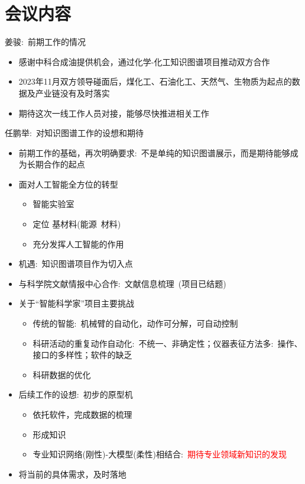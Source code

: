 
%
%
%

\section*{会议内容}
{姜骏}:~前期工作的情况
\begin{itemize}
	\item 感谢中科合成油提供机会，通过化学-化工知识图谱项目推动双方合作
	\item 2023年11月双方领导碰面后，煤化工、石油化工、天然气、生物质为起点的数据及产业链没有及时落实
	\item 期待这次一线工作人员对接，能够尽快推进相关工作
\end{itemize}

{任鹏举}:~对知识图谱工作的设想和期待
\begin{itemize}
	\item 前期工作的基础，再次明确要求:~不是单纯的知识图谱展示，而是期待能够成为长期合作的起点
	\item 面对人工智能全方位的转型
		\begin{itemize}
			\item 智能实验室
			\item 定位 基材料(能源~材料)
			\item 充分发挥人工智能的作用
		\end{itemize}
	\item 机遇:~知识图谱项目作为切入点
	\item 与科学院文献情报中心合作:~文献信息梳理~(项目已结题)
	\item 关于“智能科学家”项目主要挑战
		\begin{itemize}
			\item 传统的智能:~机械臂的自动化，动作可分解，可自动控制
			\item 科研活动的重复动作自动化:~不统一、非确定性；仪器表征方法多:~操作、接口的多样性；软件的缺乏
			\item 科研数据的优化
		\end{itemize}
	\item 后续工作的设想:~初步的原型机
		\begin{itemize}
			\item 依托软件，完成数据的梳理
			\item 形成知识
			\item 专业知识网络(刚性)-大模型(柔性)相结合:~\textcolor{red}{期待专业领域新知识的发现}
		\end{itemize}
	\item 将当前的具体需求，及时落地
\end{itemize}

